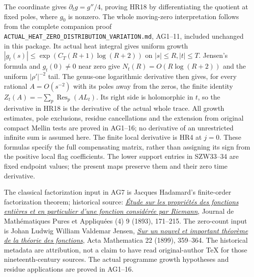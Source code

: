 The coordinate gives $\partial_tg=g''/4$, proving HR18 by
differentiating the quotient at fixed poles, where $g_0$ is
nonzero. The whole moving-zero interpretation follows from the
complete companion proof \texttt{ACTUAL\_HEAT\_ZERO\_DISTRIBUTION\_VARIATION.md},
AG1--11, included unchanged in this package. Its actual heat integral
gives uniform growth $|g_t(s)|\le\exp(C_T(R+1)\log(R+2))$
on $|s|\le R,|t|\le T$. Jensen's formula and $g_t(0)\ne0$
near zero give $N_t(R)=O(R\log(R+2))$ and the uniform
$|\rho'|^{-2}$ tail. The genus-one logarithmic derivative then
gives, for every rational $A=O(s^{-2})$ with its poles away from
the zeros, the finite identity
$Z_t(A)=-\sum_p\operatorname{Res}_p(A L_t)$.
Its right side is holomorphic in $t$, so the derivative in HR18
is the derivative of the actual whole trace. All growth estimates,
pole exclusions, residue cancellations and the extension from
original compact Mellin tests are proved in AG1--16; no derivative
of an unrestricted infinite sum is assumed here.
The finite local derivative is HR4 at $j=0$.
These formulas specify the full compensating matrix, rather than
assigning its sign from the positive local flag coefficients.
The lower support entries in SZW33--34 are fixed endpoint values;
the present maps preserve them and their zero time derivative.

The classical factorization input in AG7 is Jacques Hadamard's
finite-order factorization theorem; historical source:
\href{https://www.numdam.org/item/JMPA_1893_4_9__171_0/}{\emph{\'Etude
sur les propri\'et\'es des fonctions enti\`eres et en particulier
d'une fonction consid\'er\'ee par Riemann}}, Journal de
Math\'ematiques Pures et Appliqu\'ees (4) 9 (1893), 171--215.
The zero-count input is Johan Ludwig William Valdemar Jensen,
\href{https://doi.org/10.1007/BF02417878}{\emph{Sur un nouvel et
important th\'eor\`eme de la th\'eorie des fonctions}}, Acta
Mathematica 22 (1899), 359--364. The historical metadata are
attribution, not a claim to have read original-author TeX for
those nineteenth-century sources. The actual programme growth
hypotheses and residue applications are proved in AG1--16.

